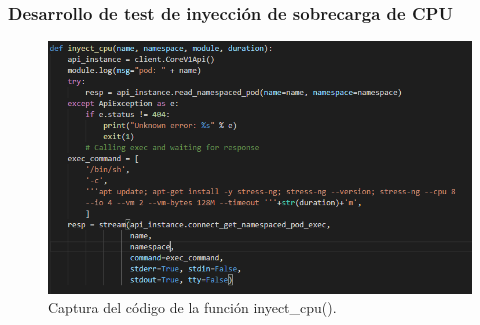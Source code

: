 \subsubsection{Desarrollo de test de inyección de sobrecarga de CPU}

\begin{figure}[htpb!]
	\centering
	\includegraphics[width=0.95\columnwidth]{images/captures/codigo/Capture_inyect_cpu.PNG}
	\caption{Captura del código de la función inyect\_cpu().}
	\label{fig:codi03}
\end{figure}

